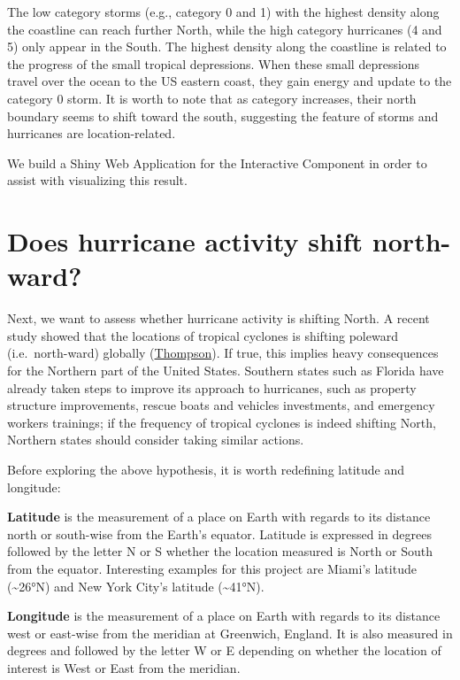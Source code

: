 \documentclass[]{book}
\begin{document}
The low category storms (e.g., category 0 and 1) with the highest density along the coastline can reach further North, while the high category hurricanes (4 and 5) only appear in the South. The highest density along the coastline is related to the progress of the small tropical depressions. When these small depressions travel over the ocean to the US eastern coast, they gain energy and update to the category 0 storm. It is worth to note that as category increases, their north boundary seems to shift toward the south, suggesting the feature of storms and hurricanes are location-related.

We build a Shiny Web Application for the Interactive Component in order to assist with visualizing this result.

\hypertarget{does-hurricane-activity-shift-north-ward}{%
\section{Does hurricane activity shift north-ward?}\label{does-hurricane-activity-shift-north-ward}}

Next, we want to assess whether hurricane activity is shifting North. A recent study showed that the locations of tropical cyclones is shifting poleward (i.e.~north-ward) globally (\href{https://www.climatecentral.org/news/warming-may-shift-hurricane-impacts-17437}{Thompson}). If true, this implies heavy consequences for the Northern part of the United States. Southern states such as Florida have already taken steps to improve its approach to hurricanes, such as property structure improvements, rescue boats and vehicles investments, and emergency workers trainings; if the frequency of tropical cyclones is indeed shifting North, Northern states should consider taking similar actions.

Before exploring the above hypothesis, it is worth redefining latitude and longitude:

\textbf{Latitude} is the measurement of a place on Earth with regards to its distance north or south-wise from the Earth's equator. Latitude is expressed in degrees followed by the letter N or S whether the location measured is North or South from the equator. Interesting examples for this project are Miami's latitude (\textasciitilde{}26°N) and New York City's latitude (\textasciitilde{}41°N).

\textbf{Longitude} is the measurement of a place on Earth with regards to its distance west or east-wise from the meridian at Greenwich, England. It is also measured in degrees and followed by the letter W or E depending on whether the location of interest is West or East from the meridian.
\end{document}
